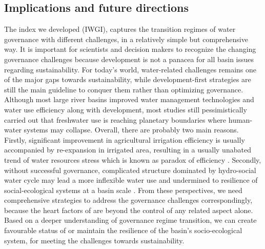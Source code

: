 \documentclass[9pt, twocolumn, twoside, lineno]{pnas-new}
\begin{document}
\subsection*{Implications and future directions}
\label{Outlook}

The index we developed (IWGI), captures the transition regimes of water governance with different challenges, in a relatively simple but comprehensive way.
It is important for scientists and decision makers to recognize the changing governance challenges because development is not a panacea for all basin issues regarding sustainability.
For today's world, water-related challenges remains one of the major gaps towards sustainability, while development-first strategies are still the main guideline to conquer them rather than optimizing governance. 
Although most large river basins improved water management technologies and water use efficiency along with development, most studies still pessimistically carried out that freshwater use is reaching planetary boundaries where human-water systems may collapse.
Overall, there are probably two main reasons.
Firstly, significant improvement in agricultural irrigation efficiency is usually accompanied by re-expansion in irrigated area, resulting in a usually unabated trend of water resources stress which is known as paradox of efficiency 
\cite{graftonParadoxIrrigationEfficiency2018}. 
Secondly, without successful governance, complicated structure dominated by hydro-social water cycle may lead a more inflexible water use and undermined to resilience of social-ecological systems at a basin scale
\cite{qinFlexibilityIntensityGlobal2019}.
From these perspectives, we need comprehensive strategies to address the governance challenges correspondingly, because the heart factors of are beyond the control of any related aspect alone. 
Based on a deeper understanding of governance regime transition, we can create favourable status of or maintain the resilience of the basin's socio-ecological system, for meeting the challenges towards sustainability.
\end{document}
